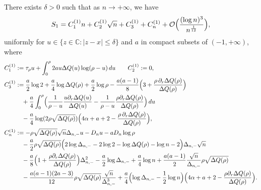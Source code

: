 \documentclass[10pt,a4paper]{amsart}
\newcommand{\C}{\mathds{C}}
\begin{document}
\begin{lemma}\label{lemma:S1}
There exists $\delta>0$ such that as $n\to+\infty$, we have 
\begin{equation}
\label{def of S1 asymptotics}
S_1= C_1^{(1)}n + C_2^{(1)}\sqrt{n}+C_3^{(1)}+C_n^{(1)}+
\mathcal{O}\Bigl(\frac{(\log n)^{3}}{n^{\frac{1}{12}}}\Bigr),    
\end{equation}
uniformly for $u\in\{z\in\C:|z-x|\leq \delta\}$ and $a$ in compact subsets of $(-1,+\infty)$, where 
\begin{align*}
C_1^{(1)}&:=
\tau_{\rho}u
+
\int_{0}^{\rho}2a u\Delta Q(u)\log(\rho-u)\,du
\qquad
C_2^{(1)}:=0,
\\
C_3^{(1)}&:=
\frac{a}{2}\log 2
+\frac{a}{4}\log\Delta Q(\rho)
+\frac{a}{2}\log\rho
-
\frac{a(a-1)}{8}\Bigl(3+\frac{\rho\,\partial_r\Delta Q(\rho)}{\Delta Q(\rho)}\Bigr)
\\
&\quad
+
\frac{a}{4}\int_0^{\rho}\Bigl(\frac{1}{\rho-u} 
\frac{u\partial_r\Delta Q(u)}{\Delta Q(u)}
-
\frac{1}{\rho-u} 
\frac{\rho\partial_r\Delta Q(\rho)}{\Delta Q(\rho)}
\Bigr)\,du
\\
&\quad
-\frac{a}{4}
\log(2\rho\sqrt{\Delta Q(\rho)})
\Bigl(4\alpha+a+2-\frac{\rho\,\partial_r\Delta Q(\rho)}{\Delta Q(\rho)}\Bigr),
\\
C_n^{(1)}&:=
-\rho\sqrt{\Delta Q(\rho)}\sqrt{n}\Delta_{n,-}u
-D_nu
-aD_{n}\log\rho
\\
&\quad
-\frac{a}{2}\rho\sqrt{\Delta Q(\rho)}
\Bigl(2\log\Delta_{n,-}-2\log 2 -\log\Delta Q(\rho)-\log n-2\Bigr)\Delta_{n,-}\sqrt{n}
\\
&\quad
-\frac{a}{8}\Bigl(1+\frac{\rho\partial_r\Delta Q(\rho)}{\Delta Q(\rho)}\Bigr)\Delta_{n,-}^2
-\frac{a}{2}\log\Delta_{n,-}
+\frac{a}{4}\log n
+\frac{a(a-1)}{2}
\frac{\sqrt{n}}{\Delta_{n,-}}\rho\sqrt{\Delta Q(\rho)}
\\
&\quad
-\frac{a(a-1)(2a-3)}{12}\rho\sqrt{\Delta Q(\rho)}\frac{\sqrt{n}}{\Delta_{n,-}^3}
+\frac{a}{4}\Bigl(\log\Delta_{n,-}-\frac{1}{2}\log n\Bigr)
\Bigl( 4\alpha+a+2 -\frac{\rho\partial_r\Delta Q(\rho)}{\Delta Q(\rho)} \Bigr).
\end{align*}
\end{lemma}
\end{document}
